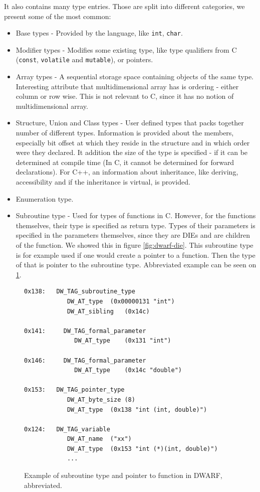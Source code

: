 It also contains many type entries.
Those are split into different categories, we present some of the most common:
\begin{itemize}
    \item Base types - Provided by the language, like \texttt{int},
        \texttt{char}.
    \item Modifier types - Modifies some existing type, like type qualifiers
        from C (\texttt{const}, \texttt{volatile} and \texttt{mutable}), or
        pointers.
    \item Array types - A sequential storage space containing objects of the
        same type. Interesting attribute that multidimensional array has is
        ordering - either column or row wise. This is not relevant to C, since
        it has no notion of multidimensional array.
    \item Structure, Union and Class types - User defined types that packs
        together number of different types. Information is provided about the
        members, especially bit offset at which they reside in the structure
        and in which order were they declared. It addition the size of the type
        is specified - if it can be determined at compile time (In C, it cannot
        be determined for forward declarations). For C++, an information about
        inheritance, like deriving, accessibility and if the inheritance is
        virtual, is provided.
    \item Enumeration type.
    \item Subroutine type - Used for types of functions in C. However, for the
        functions themselves, their type is specified as return type. Types of
        their parameters is specified in the parameters themselves, since they
        are DIEs and are children of the function. We showed this in figure
        \ref{fig:dwarf-die}. This subroutine type is for example used if one
        would create a pointer to a function. Then the type of that is pointer
        to the subroutine type. Abbreviated example can be seen on
        \ref{fig:dwarf-ptr-to-fun}.
\end{itemize}

\begin{figure}
    \begin{lstlisting}
0x138:   DW_TAG_subroutine_type
            DW_AT_type	(0x00000131 "int")
            DW_AT_sibling	(0x14c)

0x141:     DW_TAG_formal_parameter
              DW_AT_type	(0x131 "int")

0x146:     DW_TAG_formal_parameter
              DW_AT_type	(0x14c "double")

0x153:   DW_TAG_pointer_type
            DW_AT_byte_size	(8)
            DW_AT_type	(0x138 "int (int, double)")

0x124:   DW_TAG_variable
            DW_AT_name	("xx")
            DW_AT_type	(0x153 "int (*)(int, double)")
            ...
    \end{lstlisting}
    \caption{Example of subroutine type and pointer to function in DWARF,
             abbreviated.}
    \label{fig:dwarf-ptr-to-fun}
\end{figure}

